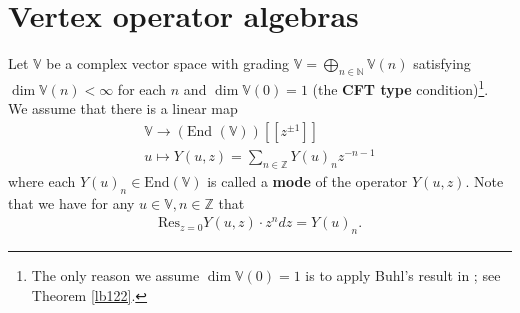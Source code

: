 \documentclass[12pt,b5paper,notitlepage]{report}
\theoremstyle{definition}
\theoremstyle{plain}
\newcommand{\End}{\mathrm{End}} %
\newcommand{\Res}{\mathrm{Res}}
\newcommand{\mbb}{\mathbb}
\newcommand{\Vbb}{\mathbb V}
\numberwithin{equation}{section}
\begin{document}
\section{Vertex operator algebras}
Let $\mbb V$ be a  complex vector space with grading $\mbb V=\bigoplus_{n\in\mathbb N}\mbb V(n)$ satisfying $\dim \mbb V(n)<\infty$ for each $n$ and $\dim\Vbb(0)=1$ (the \textbf{CFT type} condition)\footnote{The only reason we assume $\dim\Vbb(0)=1$ is to apply Buhl's result in \cite{Buhl02}; see Theorem \ref{lb122}.}.   We assume that there is a linear map
\begin{gather}
\mbb V\rightarrow(\text{End }(\mbb V))[[z^{\pm1}]]\nonumber\\
u\mapsto Y(u,z)=\sum_{n\in\mathbb Z}Y(u)_n z^{-n-1}\label{eq50}
\end{gather}
where each  $Y(u)_n\in\End(\Vbb)$ is called a \textbf{mode} of the operator $Y(u,z)$. Note that we have for any $u\in \Vbb,n\in\mbb Z$ that
\begin{align}
\Res_{z=0} Y(u,z)\cdot z^ndz=Y(u)_n.\label{eq36}
\end{align}
\end{document}
